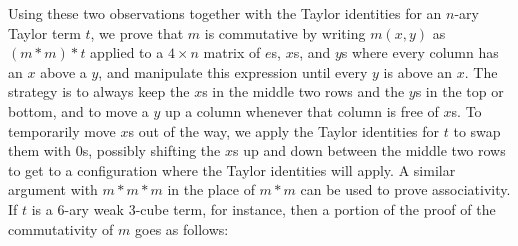 \documentclass[letterpaper,11pt]{article}
\begin{document}
\begin{rem}
Using these two observations together with the Taylor identities for an $n$-ary Taylor term $t$, we prove that $m$ is commutative by writing $m(x,y)$ as $(m*m)*t$ applied to a $4\times n$ matrix of $e$s, $x$s, and $y$s where every column has an $x$ above a $y$, and manipulate this expression until every $y$ is above an $x$. The strategy is to always keep the $x$s in the middle two rows and the $y$s in the top or bottom, and to move a $y$ up a column whenever that column is free of $x$s. To temporarily move $x$s out of the way, we apply the Taylor identities for $t$ to swap them with $0$s, possibly shifting the $x$s up and down between the middle two rows to get to a configuration where the Taylor identities will apply. A similar argument with $m*m*m$ in the place of $m*m$ can be used to prove associativity. If $t$ is a $6$-ary weak 3-cube term, for instance, then a portion of the proof of the commutativity of $m$ goes as follows:

\end{rem}
\end{document}
